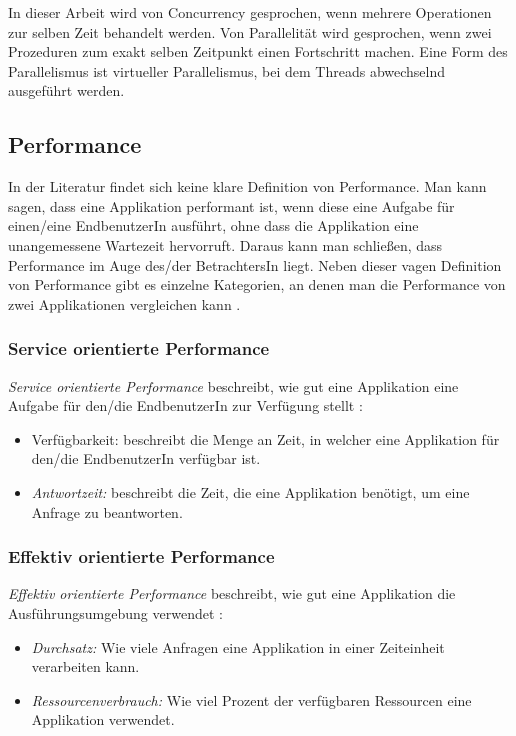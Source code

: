 In dieser Arbeit wird von Concurrency gesprochen, wenn mehrere Operationen zur selben Zeit behandelt werden.  Von Parallelität wird gesprochen, wenn zwei Prozeduren zum exakt selben Zeitpunkt einen Fortschritt machen. Eine Form des Parallelismus ist virtueller Parallelismus, bei dem Threads abwechselnd ausgeführt werden.

\subsection{Performance}

In der Literatur findet sich keine klare Definition von Performance. Man kann sagen, dass eine Applikation performant ist, wenn diese eine Aufgabe für einen/eine EndbenutzerIn ausführt, ohne dass die Applikation eine unangemessene Wartezeit hervorruft. Daraus kann man schließen, dass Performance im Auge des/der BetrachtersIn liegt. Neben dieser vagen Definition von Performance gibt es einzelne Kategorien, an denen man die Performance von zwei Applikationen vergleichen kann \cite[p. 2]{Mol2009}. 

\subsubsection{Service orientierte Performance}

\emph{Service orientierte Performance} beschreibt, wie gut eine Applikation eine Aufgabe für den/die EndbenutzerIn zur Verfügung stellt \cite[p. 2]{Mol2009}:

\begin{itemize}
  \item {Verfügbarkeit:} beschreibt die Menge an Zeit, in welcher eine Applikation für den/die EndbenutzerIn verfügbar ist.
  \item \emph{Antwortzeit:} beschreibt die Zeit, die eine Applikation benötigt, um eine Anfrage zu beantworten.
\end{itemize}


\subsubsection{Effektiv orientierte Performance}

\emph{Effektiv orientierte Performance} beschreibt, wie gut eine Applikation die Ausführungsumgebung verwendet \cite[p. 2]{Mol2009}:

\begin{itemize}
  \item \emph{Durchsatz:} Wie viele Anfragen eine Applikation in einer Zeiteinheit verarbeiten kann.
  \item \emph{Ressourcenverbrauch:} Wie viel Prozent der verfügbaren Ressourcen eine Applikation verwendet.
\end{itemize}


